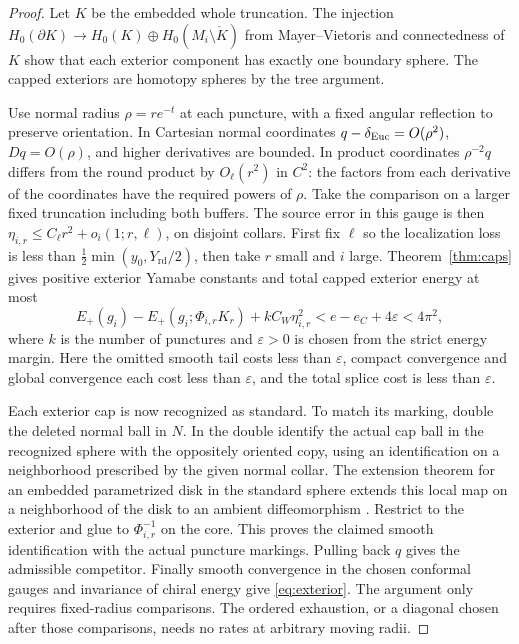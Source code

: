 \documentclass[11pt]{article}
\numberwithin{equation}{section}
\theoremstyle{definition}
\theoremstyle{remark}
\newcommand{\Yrd}{Y_{\mathrm{rd}}}
\renewcommand{\epsilon}{\varepsilon}
\begin{document}
\begin{proof}
Let \(K\) be the embedded whole truncation. The injection
\(H_0(\partial K)\to H_0(K)\oplus H_0(M_i\setminus\mathring K)\)
from Mayer--Vietoris and connectedness of \(K\) show that each
exterior component has exactly one boundary sphere. The capped
exteriors are homotopy spheres by the tree argument.

Use normal radius \(\rho=r e^{-t}\) at each puncture, with a
fixed angular reflection to preserve orientation. In Cartesian
normal coordinates \(q-\delta_{\rm Euc}=O(\rho^2)\),
\(Dq=O(\rho)\), and higher derivatives are bounded. In product
coordinates \(\rho^{-2}q\) differs from the round product by
\(O_\ell(r^2)\) in \(C^2\): the factors from each derivative of
the coordinates have the required powers of \(\rho\). Take the
comparison on a larger fixed truncation including both buffers.
The source error in this gauge is then
\(\eta_{i,r}\le C_\ell r^2+o_i(1;r,\ell)\), on disjoint collars.
First fix \(\ell\) so the localization loss is less than
\(\tfrac12\min(y_0,\Yrd/2)\), then take \(r\) small and
\(i\) large. Theorem~\ref{thm:caps} gives positive exterior
Yamabe constants and total capped exterior energy at most
\[
 E_+(g_i)-E_+(g_i;\Phi_{i,r}K_r)+k C_W\eta_{i,r}^2
 < e-e_C+4\epsilon<4\pi^2 ,
\]
where \(k\) is the number of punctures and \(\epsilon>0\) is
chosen from the strict energy margin. Here the omitted smooth
tail costs less than \(\epsilon\), compact convergence and
global convergence each cost less than \(\epsilon\), and the
total splice cost is less than \(\epsilon\).

Each exterior cap is now recognized as standard. To match its
marking, double the deleted normal ball in \(N\). In the double
identify the actual cap ball in the recognized sphere with the
oppositely oriented copy, using an identification on a
neighborhood prescribed by the given normal collar. The
extension theorem for an embedded parametrized disk in the
standard sphere extends this local map on a neighborhood of
the disk to an ambient diffeomorphism
\cite[Theorem C]{Palais1960Extending}. Restrict to the exterior
and glue to \(\Phi_{i,r}^{-1}\) on the core. This proves the
claimed smooth identification with the actual puncture
markings. Pulling back \(q\) gives the admissible competitor.
Finally smooth convergence in the chosen conformal gauges and
invariance of chiral energy give \eqref{eq:exterior}. The
argument only requires fixed-radius comparisons. The ordered
exhaustion, or a diagonal chosen after those comparisons, needs
no rates at arbitrary moving radii.
\end{proof}
\end{document}
